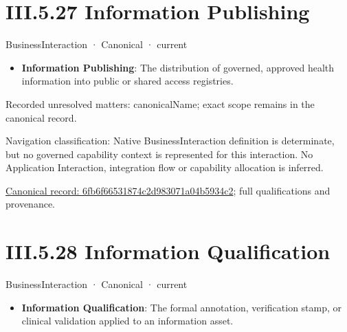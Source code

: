 \section*{III.5.27 Information Publishing}
\label{navigation:III.5.27}

\label{element:6fb6f66531874c2d983071a04b5934c2}
{\small BusinessInteraction · Canonical · current}\par

\begin{itemize}


\item \textbf{Information Publishing}: The distribution of governed, approved health information into public or shared access registries.

\end{itemize}

{\small Recorded unresolved matters: canonicalName; exact scope remains in the canonical record.}\par
{\small Navigation classification: Native BusinessInteraction definition is determinate, but no governed capability context is represented for this interaction. No Application Interaction, integration flow or capability allocation is inferred.}\par
{\footnotesize \href{../../../../../../../../continuum/business/business-interaction/6fb6f66531874c2d983071a04b5934c2.md}{Canonical record: 6fb6f66531874c2d983071a04b5934c2}; full qualifications and provenance.}\par
\section*{III.5.28 Information Qualification}
\label{navigation:III.5.28}

\label{element:6b606df4675f48b3baba03f4b2ca7602}
{\small BusinessInteraction · Canonical · current}\par

\begin{itemize}


\item \textbf{Information Qualification}: The formal annotation, verification stamp, or clinical validation applied to an information asset.

\end{itemize}

